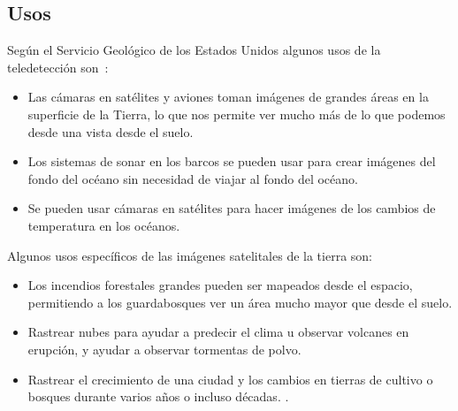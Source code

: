 \subsection{Usos}
Según el Servicio Geológico de los Estados Unidos algunos usos de la teledetección son~\cite{USGS}:
\begin{itemize}
 \item Las cámaras en satélites y aviones toman imágenes de grandes áreas en la superficie de la Tierra, lo que nos permite ver mucho más de lo que podemos desde una vista desde el suelo.
 \item Los sistemas de sonar en los barcos se pueden usar para crear imágenes del fondo del océano sin necesidad de viajar al fondo del océano.
  \item Se pueden usar cámaras en satélites para hacer imágenes de los cambios de temperatura en los océanos.
\end{itemize}
Algunos usos específicos de las imágenes satelitales de la tierra son: 
\begin{itemize}

 \item Los incendios forestales grandes pueden ser mapeados desde el espacio, permitiendo a los guardabosques ver un área mucho mayor que desde el suelo.
 \item Rastrear nubes para ayudar a predecir el clima u observar volcanes en erupción, y ayudar a observar tormentas de polvo.
 \item Rastrear el crecimiento de una ciudad y los cambios en tierras de cultivo o bosques durante varios años o incluso décadas.
.
\end{itemize}
